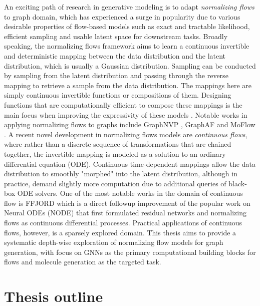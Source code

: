 An exciting path of research in generative modeling is to adapt
\textit{normalizing flows} to graph domain, which has experienced a surge in
popularity due to various desirable properties of flow-based models such as
exact and tractable likelihood, efficient sampling and usable latent space for
downstream tasks. Broadly speaking, the normalizing flows framework aims to
learn a continuous invertible and deterministic mapping between the data
distribution and the latent distribution, which is usually a Gaussian
distribution. Sampling can be conducted by sampling from the latent distribution
and passing through the reverse mapping to retrieve a sample from the data
distribution. The mappings here are simply continuous invertible functions or
compositions of them. Designing functions that are computationally efficient to
compose these mappings is the main focus when improving the expressivity of
these models \citep{kobyzevNormalizingFlowsIntroduction2021}. Notable works in
applying normalizing flows to graphs include GraphNVP
\citep{madhawaGraphNVPInvertibleFlow2019}, GraphAF
\citep{shiGraphAFFlowbasedAutoregressive2020} and MoFlow
\citep{zangMoFlowInvertibleFlow2020}. A recent novel development in normalizing
flows models are \textit{continuous flows}, where rather than a discrete
sequence of transformations that are chained together, the invertible mapping is
modeled as a solution to an ordinary differential equation (ODE). Continuous
time-dependent mappings allow the data distribution to smoothly "morphed" into
the latent distribution, although in practice, demand slightly more computation
due to additional queries of black-box ODE solvers. One of the most notable
works in the domain of continuous flow is FFJORD
\citep{grathwohlFFJORDFreeformContinuous2018} which is a direct followup
improvement of the popular work on Neural ODEs (NODE)
\citep{chenNeuralOrdinaryDifferential2019} that first formulated residual
networks and normalizing flows as continuous differential processes. Practical
applications of continuous flows, however, is a sparsely explored domain. This
thesis aims to provide a systematic depth-wise exploration of normalizing flow
models for graph generation, with focus on GNNs as the primary computational
building blocks for flows and molecule generation as the targeted task.

\section{Thesis outline}

